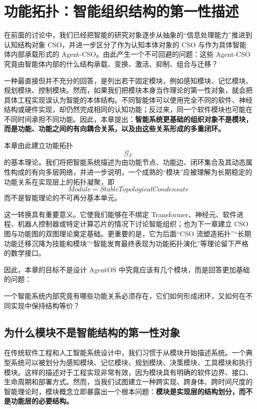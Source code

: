 \chapter{功能拓扑：智能组织结构的第一性描述}

\begin{chapterlead}
在前面的讨论中，我们已经把智能的研究对象逐步从抽象的“信息处理能力”推进到认知结构对象 CSO，并进一步区分了作为认知本体对象的 CSO 与作为具体智能体内部承载形式的 Agent-CSO。由此产生一个不可回避的问题：这些 Agent-CSO 究竟由智能体内部的什么结构承载、变换、激活、抑制、组合与迁移？

一种最直接但并不充分的回答，是列出若干固定模块，例如感知模块、记忆模块、规划模块、控制模块。然而，如果我们把模块本身当作理论的第一性对象，就会把具体工程实现误认为智能的本体结构。不同智能体可以使用完全不同的软件、神经结构或硬件实现，却仍然完成相同的认知功能；反过来，同一个软件模块也可能在不同时间承担不同功能。因此，本章提出：\textbf{智能系统更基础的组织对象不是模块，而是功能、功能之间的有向耦合关系，以及由这些关系形成的多重闭环。}

本章由此建立功能拓扑
\[
\mathcal G_F
\]
的基本理论。我们将把智能系统描述为由功能节点、功能边、闭环集合及其动态属性构成的有向多层网络，并进一步说明，一个成熟的“模块”应被理解为长期稳定的功能关系在实现层上的拓扑凝聚，即
\[
\boxed{
Module = StableTopologicalCondensate
}
\]
而不是智能理论的不可再分基本单元。

这一转换具有重要意义。它使我们能够在不绑定 Transformer、神经元、软件进程、机器人控制器或特定计算芯片的情况下讨论智能组织；也为下一章建立 CSO 图与功能图的双图理论奠定基础。更重要的是，它为后面“CSO 流塑造拓扑”“长期功能迁移沉降为技能和模块”“智能发育最终表现为功能拓扑演化”等理论留下严格的数学接口。

因此，本章的目标不是设计 AgentOS 中究竟应该有几个模块，而是回答更加基础的问题：
\begin{statementbox}
一个智能系统内部究竟有哪些功能关系必须存在，它们如何形成闭环，又如何在不同实现中保持结构等价？
\end{statementbox}
\end{chapterlead}


\section{为什么模块不是智能结构的第一性对象}

在传统软件工程和人工智能系统设计中，我们习惯于从模块开始描述系统。一个典型系统可以被划分为感知模块、记忆模块、规划模块、决策模块、工具模块和执行模块。这样的描述对于工程实现非常有效，因为模块具有明确的软件边界、接口、生命周期和部署方式。然而，当我们试图建立一种跨实现、跨身体、跨时间尺度的智能理论时，模块概念立即暴露出一个根本问题：\textbf{模块是实现层的结构划分，而不是功能层的必要结构。}

